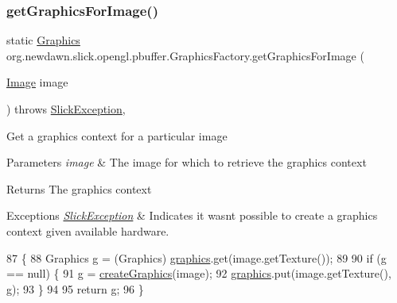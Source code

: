 \subsubsection{\texorpdfstring{get\+Graphics\+For\+Image()}{getGraphicsForImage()}}
{\footnotesize\ttfamily static \mbox{\hyperlink{classorg_1_1newdawn_1_1slick_1_1_graphics}{Graphics}} org.\+newdawn.\+slick.\+opengl.\+pbuffer.\+Graphics\+Factory.\+get\+Graphics\+For\+Image (\begin{DoxyParamCaption}\item[{\mbox{\hyperlink{classorg_1_1newdawn_1_1slick_1_1_image}{Image}}}]{image }\end{DoxyParamCaption}) throws \mbox{\hyperlink{classorg_1_1newdawn_1_1slick_1_1_slick_exception}{Slick\+Exception}}\hspace{0.3cm}{\ttfamily [inline]}, {\ttfamily [static]}}

Get a graphics context for a particular image


\begin{DoxyParams}{Parameters}
{\em image} & The image for which to retrieve the graphics context \\
\hline
\end{DoxyParams}
\begin{DoxyReturn}{Returns}
The graphics context 
\end{DoxyReturn}

\begin{DoxyExceptions}{Exceptions}
{\em \mbox{\hyperlink{classorg_1_1newdawn_1_1slick_1_1_slick_exception}{Slick\+Exception}}} & Indicates it wasn\textquotesingle{}t possible to create a graphics context given available hardware. \\
\hline
\end{DoxyExceptions}

\begin{DoxyCode}
87                                                                                   \{
88         Graphics g = (Graphics) \mbox{\hyperlink{classorg_1_1newdawn_1_1slick_1_1opengl_1_1pbuffer_1_1_graphics_factory_a782fd785834bb20f7159acf00db88712}{graphics}}.get(image.getTexture());
89         
90         \textcolor{keywordflow}{if} (g == null) \{
91             g = \mbox{\hyperlink{classorg_1_1newdawn_1_1slick_1_1opengl_1_1pbuffer_1_1_graphics_factory_a1723770d9690868f06dbac9f7742eef9}{createGraphics}}(image);
92             \mbox{\hyperlink{classorg_1_1newdawn_1_1slick_1_1opengl_1_1pbuffer_1_1_graphics_factory_a782fd785834bb20f7159acf00db88712}{graphics}}.put(image.getTexture(), g);
93         \}
94         
95         \textcolor{keywordflow}{return} g;
96     \}
\end{DoxyCode}
\mbox{\label{classorg_1_1newdawn_1_1slick_1_1opengl_1_1pbuffer_1_1_graphics_factory_aec2bf827e33a06307b20dc8470c53bca}} 
